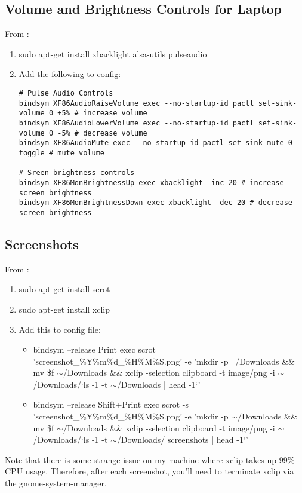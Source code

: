 \subsection{Volume and Brightness Controls for Laptop}
From \cite{quidproquo2018volume}:
\begin{enumerate}
    \item sudo apt-get install xbacklight alsa-utils pulseaudio
    \item Add the following to config:
        \begin{lstlisting}
# Pulse Audio Controls
bindsym XF86AudioRaiseVolume exec --no-startup-id pactl set-sink-volume 0 +5% # increase volume
bindsym XF86AudioLowerVolume exec --no-startup-id pactl set-sink-volume 0 -5% # decrease volume
bindsym XF86AudioMute exec --no-startup-id pactl set-sink-mute 0 toggle # mute volume

# Sreen brightness controls
bindsym XF86MonBrightnessUp exec xbacklight -inc 20 # increase screen brightness
bindsym XF86MonBrightnessDown exec xbacklight -dec 20 # decrease screen brightness
        \end{lstlisting}
\end{enumerate}

\subsection{Screenshots}
From \cite{brainlessdeveloper2017screenshot}:
\begin{enumerate}
    \item sudo apt-get install scrot
    \item sudo apt-get install xclip
    \item Add this to config file:
        \begin{itemize}
            \item bindsym --release Print exec scrot
                'screenshot\_\%Y\%m\%d\_\%H\%M\%S.png' -e 'mkdir -p ~/Downloads
                \&\& mv \$f $\sim$/Downloads \&\& xclip -selection clipboard -t
                image/png -i $\sim$/Downloads/`ls -1 -t $\sim$/Downloads | head -1`'
            \item bindsym --release Shift+Print exec scrot -s
                'screenshot\_\%Y\%m\%d\_\%H\%M\%S.png' -e 'mkdir -p
                $\sim$/Downloads \&\& mv \$f $\sim$/Downloads \&\& xclip
                -selection clipboard -t image/png -i $\sim$/Downloads/`ls -1 -t
                $\sim$/Downloads/          screenshots | head -1`'
        \end{itemize}
\end{enumerate}
Note that there is some strange issue on my machine where xclip takes up 99\%
CPU usage. Therefore, after each screenshot, you'll need to terminate xclip via
the gnome-system-manager.

